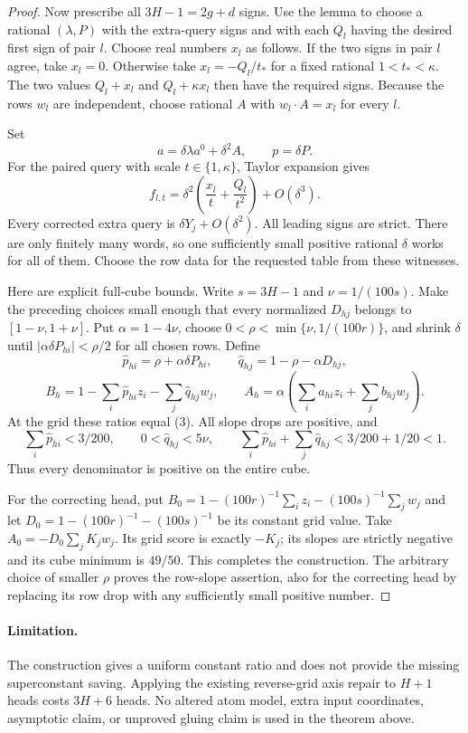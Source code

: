 \documentclass[11pt]{article}
\begin{document}
\begin{proof}
Now prescribe all $3H-1=2g+d$ signs. Use the lemma to choose a rational
$(\lambda,P)$ with the extra-query signs and with each $Q_l$ having
the desired first sign of pair $l$. Choose real numbers $x_l$ as follows.
If the two signs in pair $l$ agree, take $x_l=0$. Otherwise take
$x_l=-Q_l/t_*$ for a fixed rational $1<t_*<\kappa$.
The two values $Q_l+x_l$ and $Q_l+\kappa x_l$ then have the required
signs. Because the rows $w_l$ are independent, choose rational $A$ with
$w_l\cdot A=x_l$ for every $l$.

Set
\[
 a=\delta\lambda a^0+\delta^2 A,\qquad p=\delta P.
\]
For the paired query with scale $t\in\{1,\kappa\}$, Taylor expansion
gives
\[
 f_{l,t}=\delta^2\left(\frac{x_l}{t}+
                                  \frac{Q_l}{t^2}\right)+O(\delta^3).
 \tag{4}
\]
Every corrected extra query is $\delta Y_j+O(\delta^2)$.
All leading signs are strict. There are only finitely many words, so
one sufficiently small positive rational $\delta$ works for all of them.
Choose the row data for the requested table from these witnesses.

Here are explicit full-cube bounds. Write $s=3H-1$ and
$\nu=1/(100s)$. Make the preceding choices small enough that every
normalized $D_{hj}$ belongs to $[1-\nu,1+\nu]$. Put
$\alpha=1-4\nu$, choose $0<\rho<\min\{\nu,1/(100r)\}$, and shrink
$\delta$ until $|\alpha\delta P_{hi}|<\rho/2$ for all chosen rows.
Define
\[
 \widehat p_{hi}=\rho+\alpha\delta P_{hi},\qquad
 \widehat q_{hj}=1-\rho-\alpha D_{hj},
\]
\[
 B_h=1-\sum_i\widehat p_{hi}z_i-\sum_j\widehat q_{hj}w_j,
 \qquad
 A_h=\alpha\left(\sum_i a_{hi}z_i+\sum_j b_{hj}w_j\right).
\]
At the grid these ratios equal (3). All slope drops are positive, and
\[
 \sum_i\widehat p_{hi}<3/200,
 \qquad 0<\widehat q_{hj}<5\nu,
 \qquad \sum_i\widehat p_{hi}+\sum_j\widehat q_{hj}<3/200+1/20<1.
\]
Thus every denominator is positive on the entire cube.

For the correcting head, put
$B_0=1-(100r)^{-1}\sum_i z_i-(100s)^{-1}\sum_jw_j$ and let
$D_0=1-(100r)^{-1}-(100s)^{-1}$ be its constant grid value.
Take $A_0=-D_0\sum_jK_jw_j$. Its grid score is exactly $-K_j$;
its slopes are strictly negative and its cube minimum is $49/50$.
This completes the construction. The arbitrary choice of smaller
$\rho$ proves the row-slope assertion, also for the correcting head
by replacing its row drop with any sufficiently small positive number.
\end{proof}

\paragraph{Limitation.}
The construction gives a uniform constant ratio and does not provide
the missing superconstant saving. Applying the existing reverse-grid
axis repair to $H+1$ heads costs $3H+6$ heads. No altered atom model,
extra input coordinates, asymptotic claim, or unproved gluing claim is
used in the theorem above.
\end{document}
